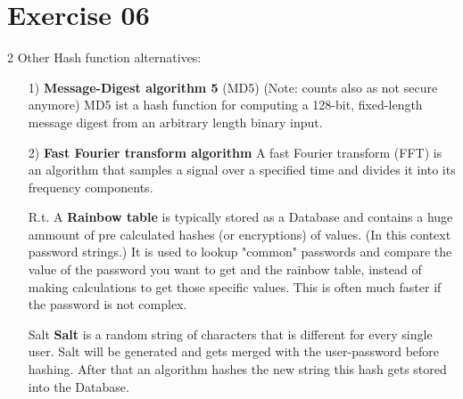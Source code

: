 \documentclass[11pt,a4paper]{scrartcl}
\begin{document}
\section*{Exercise 06}
2 Other Hash function alternatives:
\begin{itemize}
\item [1)] \textbf{Message-Digest algorithm 5} (MD5) (Note: counts also as not secure anymore)
		MD5 ist a hash function for computing a 128-bit, fixed-length message digest from an arbitrary length binary input.
\item [2)] \textbf{Fast Fourier transform algorithm}
		A fast Fourier transform (FFT) is an algorithm that samples a signal over a specified time and divides it into its frequency components.
\item [R.t.] A \textbf{Rainbow table} is typically stored as a Database and contains a huge ammount of pre calculated hashes (or encryptions) of values. (In this context password strings.) It is used to lookup "common" passwords and compare the value of the password you want to get and the rainbow table, instead of making calculations to get those specific values. This is often much faster if the password is not complex.
\item [Salt] \textbf{Salt} is a random string of characters that is different for every single user. Salt will be generated and gets merged with the user-password before hashing. After that an algorithm hashes the new string this hash gets stored into the Database.
\end{itemize}
\end{document}
